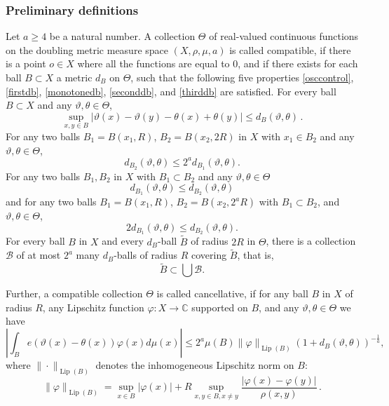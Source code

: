 \documentclass[12pt]{amsart}
\theoremstyle{definition}
\theoremstyle{plain}
\DeclareMathOperator{\Lip}{\operatorname{Lip}}
\def\C{\mathbb{C}}
\newcommand{\mfa}{{\vartheta}}
\newcommand{\mfb}{{\theta}}
\newcommand{\Mf}{{\Theta}}
\begin{document}
\subsubsection{Preliminary definitions}\label{subsubsec:definitions}

Let $a \ge 4$ be a natural number. A collection $\Mf$ of real-valued continuous functions on the doubling metric measure space $(X,\rho,\mu,a)$ is called compatible,
if there is a point $o\in X$ where all the functions are equal to $0$,
and if there exists for each ball $B \subset X$ a metric $d_B$ on $\Mf$,
such that the following five properties \eqref{osccontrol}, \eqref{firstdb}, \eqref{monotonedb}, \eqref{seconddb}, and \eqref{thirddb} are satisfied.
For every ball $B \subset X$ and any $\mfa, \mfb \in \Mf$,
\begin{equation}\label{osccontrol}
    \sup_{x,y\in B}|\mfa(x)-{\mfa(y)}- \mfb(x)+{\mfb(y)}| \le d_{B}(\mfa,\mfb)\,.
\end{equation}
For any two balls $B_1=B(x_1,R)$, $B_2= B(x_2,2R)$ in $X$ with $x_1\in B_2$ and any $\mfa,\mfb\in \Mf$,
\begin{equation}\label{firstdb}
    d_{B_2}(\mfa,\mfb) \le 2^a d_{B_1}(\mfa,\mfb) .
\end{equation}
For any two balls $B_1, B_2$ in $X$ with $B_1 \subset B_2$ and any $\mfa, \mfb \in \Mf$
\begin{equation}\label{monotonedb}
    d_{B_1}(\mfa,\mfb) \le d_{B_2}(\mfa, \mfb)
\end{equation}
and for any two balls
$B_1=B(x_1,R)$, $B_2= B(x_2,2^aR)$
with $B_1\subset B_2$, and $\mfa,\mfb\in \Mf$,
\begin{equation}\label{seconddb}
    2d_{B_1}(\mfa,\mfb) \le d_{B_2}(\mfa,\mfb) .
\end{equation}
For every ball $B$ in $X$ and every $d_B$-ball $\tilde B$ of radius $2R$ in $\Mf$, there is a collection $\mathcal{B}$ of
at most $2^a$ many $d_B$-balls of radius $R$ covering $\tilde B$, that is,
\begin{equation}\label{thirddb}
    \tilde B\subset \bigcup \mathcal{B}.
\end{equation}

Further, a compatible collection $\Mf$ is called cancellative, if
for any ball $B$ in $X$ of radius $R$, any Lipschitz function $\varphi: X\to \C$
supported on $B$, and any $\mfa,\mfb\in \Mf$ we have
\begin{equation}
    \label{eq-vdc-cond}
    |\int_B e(\mfa(x)-{\mfb(x)}) \varphi(x) d\mu(x)|\le 2^a \mu(B)\|\varphi\|_{\Lip(B)}
(1+d_B(\mfa,\mfb))^{-\frac{1}{a}},
\end{equation}
where $\|\cdot\|_{\Lip(B)}$ denotes the inhomogeneous Lipschitz norm on $B$:
$$
    \|\varphi\|_{\Lip(B)} = \sup_{x \in B} |\varphi(x)| + R \sup_{x,y \in B, x \neq y} \frac{|\varphi(x) - \varphi(y)|}{\rho(x,y)}\,.
$$
\end{document}
